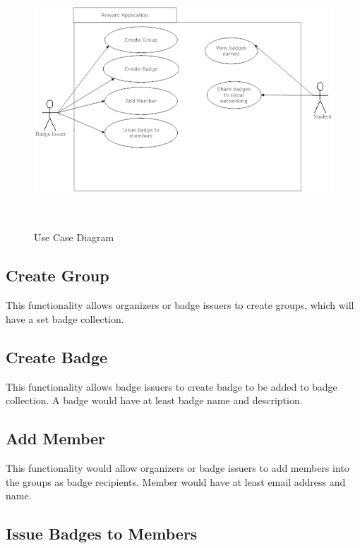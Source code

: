 \vspace{3em}
\begin{figure}[H]
\begin{center}
\includegraphics[height=3.8in,width=6.5in]{images/UseCase.png}
\caption{Use Case Diagram}
\label{fig:use_case}
\end{center}
\end{figure}

\subsection{Create Group}

This functionality allows organizers or badge issuers to create groups, which will have a set badge collection.

\subsection{Create Badge} 

This functionality allows badge issuers to create badge to be added to badge collection. A badge would have at least badge name and description.

\subsection{Add Member}

This functionality would allow organizers or badge issuers to add members into the groups as badge recipients. Member would have at least email address and name.

\subsection{Issue Badges to Members}


